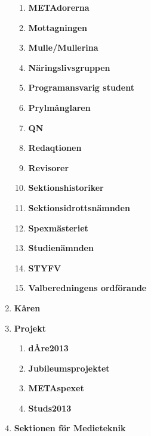 \documentclass[a4paper]{article}
\begin{document}
\begin{enumerate}
\begin{enumerate}
    \item \textbf{METAdorerna}

    \item \textbf{Mottagningen}

    \item \textbf{Mulle/Mullerina}

    \item \textbf{Näringslivsgruppen}

    \item \textbf{Programansvarig student}

    \item \textbf{Prylmånglaren}

    \item \textbf{QN}

    \item \textbf{Redaqtionen} 

    \item \textbf{Revisorer}

    \item \textbf{Sektionshistoriker}

    \item \textbf{Sektionsidrottsnämnden}

    \item \textbf{Spexmästeriet}

    \item \textbf{Studienämnden}

    \item \textbf{STYFV}

    \item \textbf{Valberedningens ordförande} 

  \end{enumerate}

\item \textbf{Kåren}

\item \textbf{Projekt}

  \begin{enumerate}

    \item \textbf{dÅre2013}

    \item \textbf{Jubileumsprojektet}

    \item \textbf{METAspexet}

    \item \textbf{Studs2013}

  \end{enumerate}

\item \textbf{Sektionen för Medieteknik}

\end{enumerate}
\end{document}
